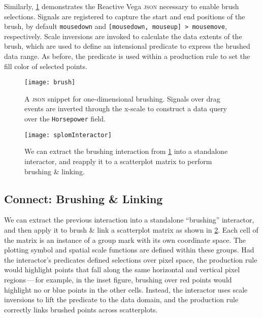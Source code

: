 Similarly, \cref{fig:vg:brush} demonstrates the Reactive Vega \textsc{json}
necessary to enable brush selections. Signals are registered to capture the
start and end positions of the brush, by default \texttt{mousedown} and
\texttt{[mousedown, mouseup] > mousemove}, respectively. Scale inversions are
invoked to calculate the data extents of the brush, which are used to define an
intensional predicate to express the brushed data range. As before, the
predicate is used within a production rule to set the fill color of selected
points.

\begin{figure}[h!]
  \centering
  \texttt{[image: brush]}
  \caption{A \textsc{json} snippet for one-dimensional brushing. Signals over
  drag events are inverted through the x-scale to construct a data query over
  the \texttt{Horsepower} field.}
  \label{fig:vg:brush}
\end{figure}

\begin{figure}[h!]
  \centering
  \texttt{[image: splomInteractor]}
  \caption{We can extract the brushing interaction from \cref{fig:vg:brush}
  into a standalone interactor, and reapply it to a scatterplot matrix to
  perform brushing \& linking.}
  \label{fig:vg:splomInteractor}
\end{figure}

\subsection{Connect: Brushing \& Linking}

\vspace{-7pt}


We can extract the previous interaction into a standalone ``brushing''
interactor, and then apply it to brush \& link a scatterplot matrix as shown in
\cref{fig:vg:splomInteractor}. Each cell of the matrix is an instance of a group
mark with its own coordinate space. The plotting symbol and spatial scale
functions are defined within these groups. Had the interactor's predicates
defined selections over pixel space, the production rule would highlight points
that fall along the same horizontal and vertical pixel regions\,---\,for
example, in the inset figure, brushing over red points would highlight no or
blue points in the other cells. Instead, the interactor uses scale inversions to
lift the predicate to the data domain, and the production rule correctly links
brushed points across scatterplots.

